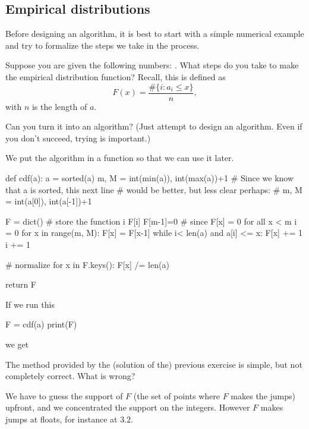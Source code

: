 \documentclass{scrartcl}
\begin{document}
\subsection{Empirical distributions}
\label{sec:empir-distr}

Before designing an algorithm, it is best to start with a simple numerical example and try to formalize the steps we take in the process.

\begin{exercise}
  Suppose you are given the following numbers: . What steps do you take to make the empirical distribution function? Recall, this is defined as
  \begin{equation}
    \label{eq:1}
    F(x) = \frac{\# \{i : a_i \leq x\}}{n}, 
  \end{equation}
  with $n$ is the length of $a$.

Can you turn it into an algorithm? (Just attempt to design an algorithm. Even if you don't succeed, trying is important.)

  \begin{solution}
We put the algorithm in a function so that we can use it later.
    \begin{pyblock}
def cdf(a):
    a = sorted(a)
    m, M = int(min(a)), int(max(a))+1
    # Since we know that a is sorted, this next line 
    # would be better, but less clear perhaps: 
    # m, M = int(a[0]), int(a[-1])+1 

    F = dict() # store the function i \to F[i]
    F[m-1]=0  # since F[x] = 0 for all x < m
    i = 0
    for x in range(m, M):
        F[x] = F[x-1]
        while i< len(a) and a[i] <= x:
            F[x] += 1
            i += 1

    # normalize
    for x in F.keys(): 
        F[x] /= len(a)

    return F
    \end{pyblock}

If we run this
\begin{pyblock}
F = cdf(a)
print(F)
\end{pyblock}
we get

\printpythontex

  \end{solution}
\end{exercise}

\begin{exercise}
  The method provided by the (solution of the) previous exercise is simple, but not completely correct. What is wrong?
  \begin{solution}
    We have to guess the support of $F$ (the set of points where $F$ makes the jumps) upfront, and we concentrated the support on the integers. However $F$ makes jumps at floats, for instance  at $3.2$. 
  \end{solution}
\end{exercise}
\end{document}
